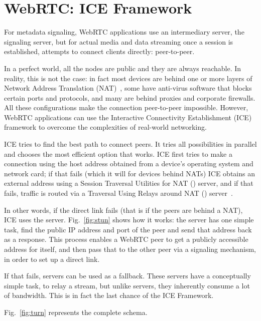 \section{WebRTC: ICE Framework}
\label{sec:webrtc_ice}
For metadata signaling, WebRTC applications use an intermediary server, the signaling server, but for actual media and data streaming once a session is established, \RTCPeerConnection attempts to connect clients directly: peer-to-peer. 

In a perfect world, all the nodes are public and they are always reachable. In reality, this is not the case: in fact most devices are behind one or more layers of Network Address Translation (NAT)~\cite{nat}, some have anti-virus software that blocks certain ports and protocols, and many are behind proxies and corporate firewalls. All these configurations make the connection peer-to-peer impossible. However, WebRTC applications can use the Interactive Connectivity Establishment (ICE) framework to overcome the complexities of real-world networking. 

ICE tries to find the best path to connect peers. It tries all possibilities in parallel and chooses the most efficient option that works. ICE first tries to make a connection using the host address obtained from a device's operating system and network card; if that fails (which it will for devices behind NATs) ICE obtains an external address using a Session Traversal Utilities for NAT (\STUN) server, and if that fails, traffic is routed via a Traversal Using Relays around NAT (\TURN) server~\cite{webrtc_infrastructure}. 

In other words, if the direct link fails (that is if the peers are behind a NAT), ICE uses the \STUN server. Fig.~\ref{fig:stun} shows how it works: the server has one simple task, find the public IP address and port of the peer and send that address back as a response.  This process enables a WebRTC peer to get a publicly accessible address for itself, and then pass that to the other peer via a signaling mechanism, in order to set up a direct link.

If that fails, \TURN servers can be used as a fallback. These servers have a conceptually simple task, to relay a stream, but unlike \STUN servers, they inherently consume a lot of bandwidth. This is in fact the last chance of the ICE Framework.

Fig.~\ref{fig:turn} represents the complete schema.

